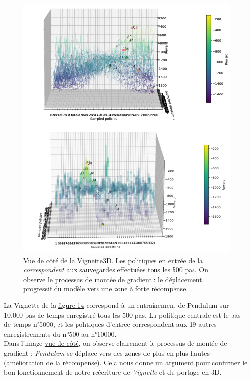 \documentclass[12pt]{article}
\begin{document}
\begin{figure}[htp]
    \centering
    \includegraphics[width=15cm]{Images/vignette_cote}
    \caption{Vue de côté de la \hyperref[fig:vignette3D]{Vignette3D}. Les politiques en entrée de la \emph{correspondent} aux sauvegardes effectuées tous les 500 pas. On observe le processus de montée de gradient : le déplacement progressif du modèle vers une zone à forte récompense.}
    \label{fig:vignetteCote}
\end{figure}

La Vignette de la \hyperref[fig:vignetteCote]{figure 14} correspond à un entraînement de Pendulum sur 10.000 pas de temps enregistré tous les 500 pas. La politique centrale est le pas de temps n°5000, et les politiques d'entrée correspondent aux 19 autres enregistrements du n°500 au n°10000. \\

Dans l'image \hyperref[fig:vignetteCote]{vue de côté}, on observe clairement le processus de montée de gradient : \emph{Pendulum} se déplace vers des zones de plus en plus hautes (amélioration de la récompense). Cela nous donne un argument pour confirmer le bon fonctionnement de notre réécriture de \emph{Vignette} et du portage en 3D.\\
\end{document}
